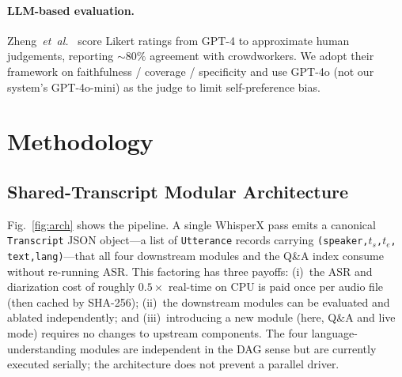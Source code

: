 \documentclass[11pt,a4paper]{article}
\begin{document}
\paragraph{LLM-based evaluation.}
Zheng~\emph{et~al.}~\cite{zheng2023judge} score Likert ratings from
GPT-4 to approximate human judgements, reporting ${\sim}80\%$
agreement with crowdworkers. We adopt their framework on
faithfulness / coverage / specificity and use GPT-4o (not our
system's GPT-4o-mini) as the judge to limit self-preference bias.

\section{Methodology}
\label{sec:method}

\subsection{Shared-Transcript Modular Architecture}
\label{sec:arch}

Fig.~\ref{fig:arch} shows the pipeline. A single WhisperX pass emits
a canonical \texttt{Transcript} JSON object---a list of
\texttt{Utterance} records carrying \texttt{(speaker,$t_s$,$t_e$,%
text,lang)}---that all four downstream modules and the Q\&A index
consume without re-running ASR. This factoring has three payoffs:
(i)~the ASR and diarization cost of roughly $0.5\times$ real-time on
CPU is paid once per audio file (then cached by SHA-256); (ii)~the
downstream modules can be evaluated and ablated independently; and
(iii)~introducing a new module (here, Q\&A and live mode) requires no
changes to upstream components. The four language-understanding
modules are independent in the DAG sense but are currently executed
serially; the architecture does not prevent a parallel driver.
\end{document}
